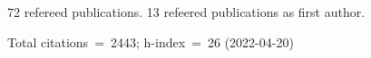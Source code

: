 72 refereed publications. 13 refeered publications as first author.

Total citations~=~2443; h-index~=~26 (2022-04-20)